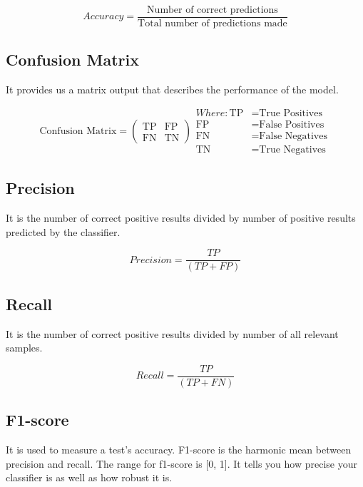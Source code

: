 \begin{equation}
\label{eq:accuracy_formula} 
Accuracy = \frac{\text{Number of correct predictions}}{\text{Total number of predictions made}}
\end{equation}

\subsection{Confusion Matrix}
It provides us a matrix output that describes the performance of the model. 

\begin{equation}
\label{eq:confusion_matrix}
\text{Confusion Matrix} = \begin{pmatrix}
\text{TP} & \text{FP} \\
\text{FN} & \text{TN}
\end{pmatrix}
\begin{aligned}
Where:
\text{TP} & = \text{True Positives} \\
\text{FP} & = \text{False Positives} \\
\text{FN} & = \text{False Negatives} \\
\text{TN} & = \text{True Negatives}
\end{aligned}
\end{equation}

\subsection{Precision}
It is the number of correct positive results divided by number of positive results predicted by the classifier. 

\begin{equation}
\label{eq:precision} 
Precision = \frac{TP}{(TP+FP)}
\end{equation}

\subsection{Recall}
It is the number of correct positive results divided by number of all relevant samples. 

\begin{equation}
\label{eq:recall} 
Recall = \frac{TP}{(TP+FN)}
\end{equation}

\subsection{F1-score}
It is used to measure a test’s accuracy. F1-score is the harmonic mean between precision and recall. The range for  f1-score is [0, 1]. It tells you how precise your classifier is as well as how robust it is.

